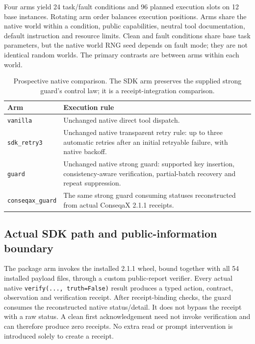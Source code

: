 Four arms yield 24 task/fault conditions and 96 planned execution slots on
12 base instances. Rotating arm order balances execution positions. Arms share
the native world within a condition, public capabilities, neutral tool
documentation, default instruction and resource limits. Clean and fault
conditions share base task parameters, but the native world RNG seed depends
on fault mode; they are not identical random worlds. The primary contrasts are
between arms within each world.

\begin{table}[t]
\caption{Prospective native comparison. The SDK arm preserves the supplied
strong guard's control law; it is a receipt-integration comparison.}
\label{tab:limbo-arms}
\centering\small
\setlength{\tabcolsep}{3pt}
\begin{tabular}{p{}p{}}
\toprule
Arm & Execution rule \\
\midrule
\texttt{vanilla} & Unchanged native direct tool dispatch. \\
\texttt{sdk\_retry3} & Unchanged native transparent retry rule: up to three
automatic retries after an initial retryable failure, with native backoff. \\
\texttt{guard} & Unchanged native strong guard: supported key insertion,
consistency-aware verification, partial-batch recovery and repeat suppression. \\
\texttt{conseqax\_guard} & The same strong guard consuming statuses reconstructed
from actual ConseqaX 2.1.1 receipts. \\
\bottomrule
\end{tabular}
\end{table}

\subsection{Actual SDK path and public-information boundary}

The package arm invokes the installed 2.1.1 wheel, bound together with all
54 installed payload files, through a custom public-report verifier. Every
actual native \texttt{verify(..., truth=False)} result produces a typed action,
contract, observation and verification receipt. After receipt-binding checks,
the guard consumes the reconstructed native status/detail. It does not bypass
the receipt with a raw status. A clean first acknowledgement need not invoke
verification and can therefore produce zero receipts. No extra read or prompt
intervention is introduced solely to create a receipt.

